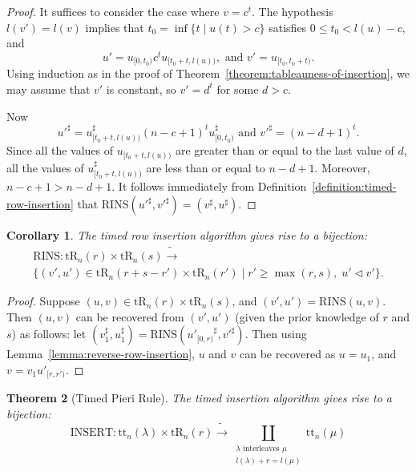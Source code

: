 \documentclass[10pt]{amsproc}
\newtheorem{theorem}{Theorem}[subsection]
\newtheorem{corollary}[theorem]{Corollary}
\theoremstyle{definition}
\theoremstyle{remark}
\newcommand{\rowins}{\mathrm{RINS}}
\newcommand{\ins}{\mathrm{INSERT}}
\newcommand{\ttab}{\mathrm{tt}}
\newcommand{\tr}{\mathrm{tR}}
\begin{document}
\begin{proof}
  It suffices to consider the case where $v=c^t$.
  The hypothesis $l(v')=l(v)$ implies that $t_0=\inf\{t\mid u(t)>c\}$ satisfies $0\leq t_0<l(u)-c$, and
  \begin{displaymath}
    u'=u_{[0,t_0)}c^tu_{[t_0+t,l(u))}, \text{ and } v'=u_{[t_0,t_0+t)}.
  \end{displaymath}
  Using induction as in the proof of Theorem~\ref{theorem:tableauness-of-insertion}, we may assume that $v'$ is constant, so $v'=d^t$ for some $d>c$.

  Now
  \begin{displaymath}
    {u'}^\sharp=u_{[t_0+t,l(u))}^\sharp (n-c+1)^t u_{[0,t_0)}^\sharp \text{ and } {v'}^\sharp=(n-d+1)^t.
  \end{displaymath}
  Since all the values of $u_{[t_0+t,l(u))}$ are greater than or equal to the last value of $d$, all the values of $u_{[t_0+t,l(u))}^\sharp$ are less than or equal to $n-d+1$.
  Moreover, $n-c+1>n-d+1$.
  It follows immediately from Definition~\ref{definition:timed-row-insertion} that $\rowins({u'}^\sharp,{v'}^\sharp)=(v^\sharp,u^\sharp)$.
\end{proof}
\begin{corollary}
  \label{corollary:row-insertion-bijection}
  The timed row insertion algorithm gives rise to a bijection:
  \begin{multline*}
    \rowins: \tr_n(r)\times \tr_n(s) \tilde\to \\\{(v',u')\in \tr_n(r+s-r')\times \tr_n(r')\mid r'\geq \max(r,s),\; u'\lhd v'\}. 
  \end{multline*}
\end{corollary}
\begin{proof}
  Suppose $(u,v)\in \tr_n(r)\times \tr_n(s)$, and $(v',u')=\rowins(u,v)$.
  Then $(u,v)$ can be recovered from $(v',u')$ (given the prior knowledge of $r$ and $s$) as follows:
  let $(v_1^\sharp, u_1^\sharp)=\rowins({u'_{[0,r)}}^\sharp, {v'}^\sharp)$.
  Then using Lemma~\ref{lemma:reverse-row-insertion}, $u$ and $v$ can be recovered as $u=u_1$, and $v=v_1u'_{[r,r')}$.
\end{proof}
\begin{theorem}[Timed Pieri Rule]
  \label{theorem:pieri}
  The timed insertion algorithm gives rise to a bijection:
  \begin{displaymath}
    \ins: \ttab_n(\lambda)\times \tr_n(r) \tilde\to \coprod_{\begin{smallmatrix}\text{$\lambda$ interleaves $\mu$}\\{l(\lambda)+r = l(\mu)}\end{smallmatrix}} \ttab_n(\mu)
  \end{displaymath}
\end{theorem}
\end{document}
